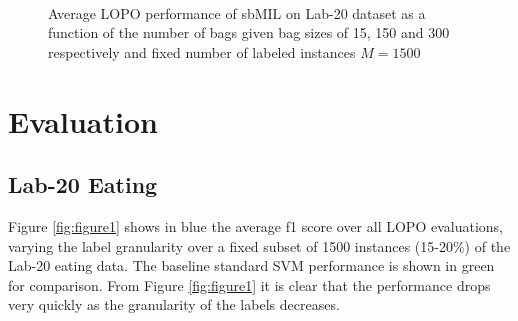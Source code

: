 \documentclass{sigchi}
\begin{document}
\begin{figure}
  \centering
  \qquad
  \qquad
  \caption{Average LOPO performance of sbMIL on Lab-20 dataset as a function of the number of bags given bag sizes of 15, 150 and 300 respectively and fixed number of labeled instances $M = 1500$}~\label{fig:figure3}
\end{figure}

\section{Evaluation}

\subsection{Lab-20 Eating}

Figure \ref{fig:figure1} shows in blue the average f1 score over all LOPO evaluations, varying the label granularity over a fixed subset of 1500 instances (15-20\%) of the Lab-20 eating data. The baseline standard SVM performance is shown in green for comparison. From Figure \ref{fig:figure1} it is clear that the performance drops very quickly as the granularity of the labels decreases.
\end{document}
